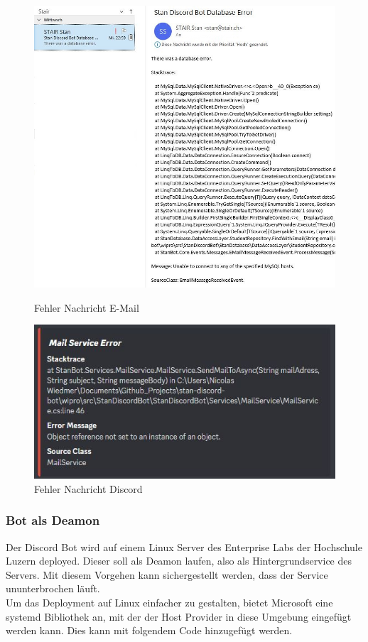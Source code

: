\documentclass[a4paper, table]{article}
\begin{document}
\begin{figure}[h]
    \begin{minipage}[t]{0.5\textwidth}
        \includegraphics[width=1\textwidth]{img/DatabaseErrorNotificationEmail.png}
        \caption{Fehler Nachricht E-Mail}
    \end{minipage}
    \begin{minipage}[t]{0.5\textwidth}
        \includegraphics[width=1\textwidth]{img/MailErrorNotificationEmbed.png}
        \caption{Fehler Nachricht Discord}
    \end{minipage}
    \label{fig:error-notifications}
\end{figure}

\subsubsection{Bot als Deamon}
Der Discord Bot wird auf einem Linux Server des Enterprise Labs der Hochschule Luzern deployed. 
Dieser soll als Deamon laufen, also als Hintergrundservice des Servers. 
Mit diesem Vorgehen kann sichergestellt werden, dass der Service ununterbrochen läuft.\\
Um das Deployment auf Linux einfacher zu gestalten, bietet Microsoft eine systemd Bibliothek an, mit der der Host Provider in diese Umgebung eingefügt werden kann.\autocite{dotnet-bot_systemdhostbuilderextensionsusesystemdihostbuilder_nodate}
Dies kann mit folgendem Code hinzugefügt werden.
\end{document}
